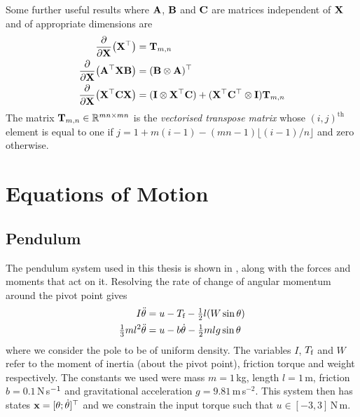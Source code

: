 Some further useful results where $\mathbf{A}$, $\mathbf{B}$ and $\mathbf{C}$ are matrices independent of $\mathbf{X}$ and of appropriate dimensions are
\begin{align}
\frac{\mathrm{\partial} }{\mathrm{\partial} \mathbf{X}} \big( \mathbf{X}^\top \big) &= \mathbf{T}_{m,n} \\
\frac{\mathrm{\partial} }{\mathrm{\partial} \mathbf{X}} \big( \mathbf{A}^\top\mathbf{X}\mathbf{B} \big) &= (\mathbf{B}\otimes\mathbf{A})^\top \\
\frac{\mathrm{\partial} }{\mathrm{\partial} \mathbf{X}} \big( \mathbf{X}^\top\mathbf{C}\mathbf{X} \big) &= (\mathbf{I}\otimes\mathbf{X}^\top\mathbf{C}) + (\mathbf{X}^\top\mathbf{C}^\top\otimes\mathbf{I})\mathbf{T}_{m,n}
\end{align}
The matrix $\mathbf{T}_{m,n} \in \mathbb{R}^{mn \times mn}$ is the \textit{vectorised transpose matrix} whose $(i,j)^{\text{th}}$ element is equal to one if $j=1+m(i-1)-(mn-1)\lfloor(i-1)/n\rfloor$ and zero otherwise.





\chapter{E\lowercase{quations of} M\lowercase{otion}}


\section{Pendulum} \label{app:pend}
The pendulum system used in this thesis is shown in , along with the forces and moments that act on it. Resolving the rate of change of angular momentum around the pivot point gives
\begin{align}
\nonumber I\ddot\theta &= u - T_{\text{f}} - \tfrac{1}{2}l(W\sin\theta) \\
\tfrac{1}{3}ml^2 \ddot{\theta} &= u - b\dot\theta - \tfrac{1}{2}mlg\sin\theta
\end{align}
where we consider the pole to be of uniform density. The variables $I$, $T_{\text{f}}$ and $W$ refer to the moment of inertia (about the pivot point), friction torque and weight respectively. The constants we used were mass $m=1\,$kg, length $l=1\,$m, friction $b = 0.1\,$N$\,$s$^{-1}$ and gravitational acceleration $g=9.81\,$m$\,$s$^{-2}$. This system then has states $\mathbf{x} = [\theta; \dot\theta]^\top$ and we constrain the input torque such that $u\in [-3,3]\,$N$\,$m.




